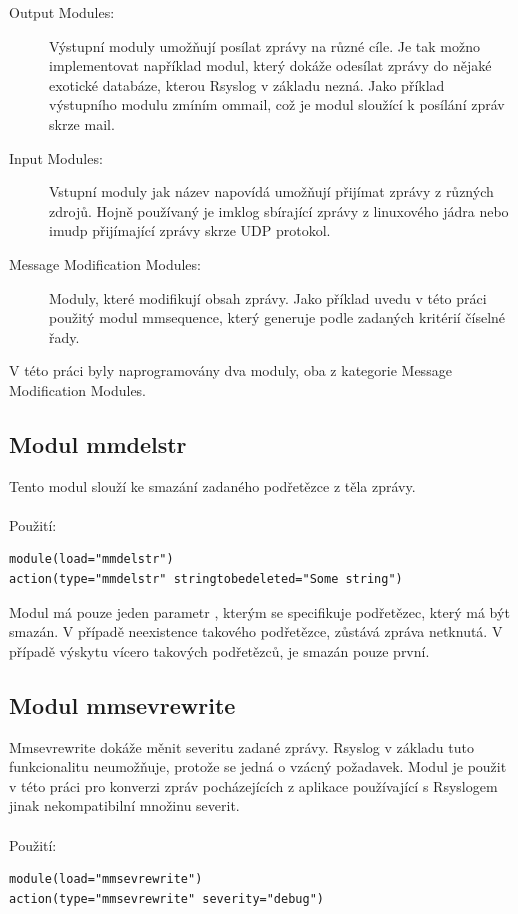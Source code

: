 \documentclass[thesis=B,czech]{FITthesis}[2012/06/26]
\begin{document}
\begin{description}
  \item [Output Modules:] Výstupní moduly umožňují posílat zprávy na různé cíle. Je tak možno implementovat například modul, který dokáže odesílat zprávy do nějaké exotické databáze, kterou Rsyslog v základu nezná. Jako příklad výstupního modulu zmíním ommail, což je modul sloužící k posílání zpráv skrze mail.
  \item [Input Modules:] Vstupní moduly jak název napovídá umožňují přijímat zprávy z různých zdrojů. Hojně používaný je imklog sbírající zprávy z linuxového jádra nebo imudp přijímající zprávy skrze UDP protokol.
  \item [Message Modification Modules:] Moduly, které modifikují obsah zprávy. Jako příklad uvedu v této práci použitý modul mmsequence, který generuje podle zadaných kritérií číselné řady.
\end{description}


V této práci byly naprogramovány dva moduly, oba z kategorie Message Modification Modules.

\subsection{Modul mmdelstr}
Tento modul slouží ke smazání zadaného podřetězce z těla zprávy.
\\
\\
Použití:
\begin{lstlisting}
module(load="mmdelstr") 
action(type="mmdelstr" stringtobedeleted="Some string")
\end{lstlisting}

Modul má pouze jeden parametr , kterým se specifikuje podřetězec, který má být smazán. V případě neexistence takového podřetězce, zůstává zpráva netknutá. V případě výskytu vícero takových podřetězců, je smazán pouze první.

\subsection{Modul mmsevrewrite}
Mmsevrewrite dokáže měnit severitu zadané zprávy. Rsyslog v základu tuto funkcionalitu neumožňuje, protože se jedná o vzácný požadavek. Modul je použit v této práci pro konverzi zpráv pocházejících z aplikace používající s Rsyslogem jinak nekompatibilní množinu severit.
\\
\\
Použití:
\begin{lstlisting}
module(load="mmsevrewrite")
action(type="mmsevrewrite" severity="debug")
\end{lstlisting}
\end{document}
